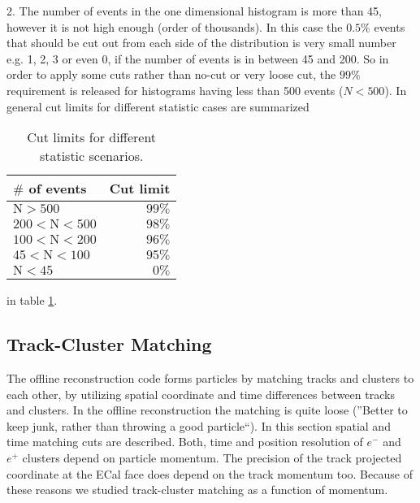 \documentclass[letterpaper,12pt]{article}
\begin{document}
\vskip 1cm
2. The number of events in the one dimensional histogram is more than 45, however it is not high enough (order of thousands). In this case the $0.5\%$ events that should be cut out from each side of the distribution is very small number e.g. 1, 2, 3 or even 0, if the number of events is in between 45 and 200. So in order to apply some cuts rather than no-cut or very loose cut, the $99\%$ requirement is released for histograms having less than 500 events ($N < 500$).
In general cut limits for different statistic cases are summarized
\begin{table}[!htb]
 \centering
 \begin{tabular}{|l|r|}
  \hline
 \textbf{ $\#$ of events} & \textbf{Cut limit} \\ \hline
  $\mathrm{ N > 500}$ & $99\%$ \\ \hline
  $\mathrm{200 < N < 500}$ & $98\%$ \\ \hline
  $\mathrm{100 < N < 200}$ & $96\%$ \\ \hline
  $\mathrm{45 < N < 100}$ & $95\%$ \\ \hline
  $\mathrm{N < 45}$ & $0\%$ \\ \hline
 \end{tabular}
\caption{Cut limits for different statistic scenarios.}
\label{tb:2DCutLimits}
\end{table}
in table \ref{tb:2DCutLimits}.

\subsection{Track-Cluster Matching}
The offline reconstruction code forms particles by matching tracks and clusters to each other, by utilizing spatial coordinate and time differences between tracks and clusters.
In the offline reconstruction the matching is quite loose (''Better to keep junk, rather than throwing a good particle``). In this section spatial and time matching cuts are described. Both, time and position resolution of $e^{-}$ and $e^{+}$ clusters depend on particle momentum. The precision of the track projected coordinate at the ECal face does depend on the track momentum too. Because of these reasons we studied track-cluster matching as a function of momentum.
\end{document}
